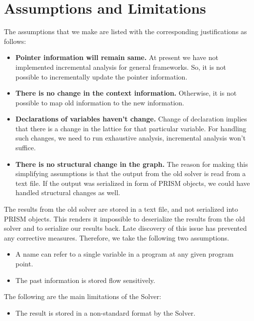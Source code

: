\documentclass[11pt,a4paper,openright]{report}
\begin{document}
\section{Assumptions and Limitations }

The assumptions that we make are listed with the corresponding justifications as follows:
\begin{itemize}
\item \textbf{Pointer information will remain same.}
At present we have not implemented incremental analysis for general frameworks. So, it is not possible to incrementally update the pointer information.
\item \textbf{There is no change in the context information.}
Otherwise, it is not possible to map old information to the new information.

\item \textbf{Declarations of variables haven't change.}
Change of declaration implies that there is a change in the lattice for that particular variable. For handling such changes, we need to 
run exhaustive analysis, incremental analysis won't suffice.
\item \textbf{There is no structural change in the graph.}
The reason for making this simplifying assumptions is that the output from the old solver is read from a text file. If the output was
serialized in form of PRISM objects, we could have handled structural changes as well.


\end{itemize}


The results from the old solver are stored in a text file, and not serialized into PRISM objects.
This renders it impossible to deserialize the results from the old solver and to serialize our results back.
Late discovery of this issue has prevented any corrective measures. Therefore, we take the following two assumptions. 
\begin{itemize}
\item A name can refer to a single variable in a program at any given program point.
\item The past information is stored flow sensitively.
\end{itemize}


The following are the main limitations of the Solver:
\begin{itemize}
 \item The result is stored in a non-standard format by the Solver.
 \end{itemize}
\end{document}

